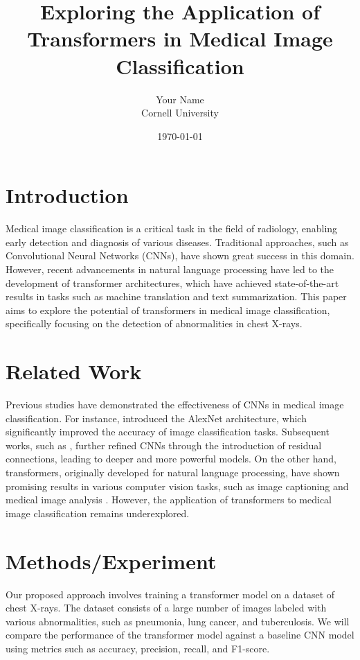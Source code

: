 \documentclass{article}
\title{Exploring the Application of Transformers in Medical Image Classification}
\author{Your Name \\ Cornell University}
\date{\today}
\begin{document}
\maketitle

\section{Introduction}
Medical image classification is a critical task in the field of radiology, enabling early detection and diagnosis of various diseases. Traditional approaches, such as Convolutional Neural Networks (CNNs), have shown great success in this domain. However, recent advancements in natural language processing have led to the development of transformer architectures, which have achieved state-of-the-art results in tasks such as machine translation and text summarization. This paper aims to explore the potential of transformers in medical image classification, specifically focusing on the detection of abnormalities in chest X-rays.

\section{Related Work}
Previous studies have demonstrated the effectiveness of CNNs in medical image classification. For instance, \cite{Krizhevsky2012} introduced the AlexNet architecture, which significantly improved the accuracy of image classification tasks. Subsequent works, such as \cite{He2016}, further refined CNNs through the introduction of residual connections, leading to deeper and more powerful models. On the other hand, transformers, originally developed for natural language processing, have shown promising results in various computer vision tasks, such as image captioning \cite{Dosovitskiy2020} and medical image analysis \cite{Rajpurkar2018}. However, the application of transformers to medical image classification remains underexplored.

\section{Methods/Experiment}
Our proposed approach involves training a transformer model on a dataset of chest X-rays. The dataset consists of a large number of images labeled with various abnormalities, such as pneumonia, lung cancer, and tuberculosis. We will compare the performance of the transformer model against a baseline CNN model using metrics such as accuracy, precision, recall, and F1-score.
\end{document}
